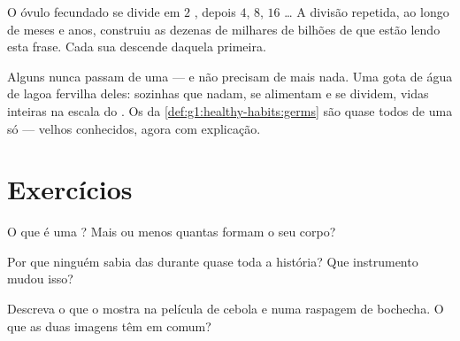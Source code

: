 \begin{example}\label{ex:g5:first-look-at-cells:one}
O óvulo fecundado se divide em $2$ , depois $4$, $8$, $16$
\dots{} A divisão repetida, ao longo de meses e anos, construiu as
dezenas de milhares de bilhões de  que estão lendo esta
frase. Cada  sua descende daquela primeira.
\end{example}

\begin{remark}\label{rem:g5:first-look-at-cells:onecelled}
Alguns  nunca passam de uma  --- e não precisam de
mais nada. Uma gota de água de lagoa fervilha deles: 
sozinhas que nadam, se alimentam e se dividem, vidas inteiras na
escala do . Os  da
\cref{def:g1:healthy-habits:germs} são quase todos  de
uma  só --- velhos conhecidos, agora com explicação.
\end{remark}

\section{Exercícios}

\begin{exercise}[$\star$]\label{exo:g5:first-look-at-cells:1}
O que é uma ? Mais ou menos quantas formam o seu corpo?
\end{exercise}

\begin{exercise}[$\star$]\label{exo:g5:first-look-at-cells:2}
Por que ninguém sabia das  durante quase toda a história? Que
instrumento mudou isso?
\end{exercise}

\begin{exercise}[$\star$]\label{exo:g5:first-look-at-cells:3}
Descreva o que o  mostra na película de cebola e numa
raspagem de bochecha. O que as duas imagens têm em comum?
\end{exercise}

